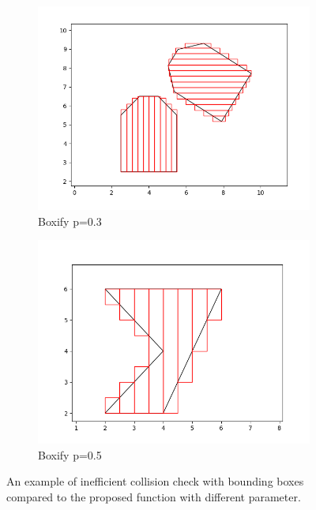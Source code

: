 \documentclass[a4paper,12pt]{article}
\DeclareRobustCommand{\[}{\begin{equation}}
\DeclareRobustCommand{\]}{\end{equation}}
\numberwithin{equation}{section}
\numberwithin{algorithm}{section}
\begin{document}
\begin{figure}[H]
\begin{subfigure}[b]{0.4\textwidth}
    \end{subfigure}
    \begin{subfigure}[b]{0.4\textwidth}
        \includegraphics[scale=0.3,width=\textwidth]{images/car_boxify_0_3.png}
        \caption{Boxify p=0.3}
    \end{subfigure}
    \begin{subfigure}[b]{0.4\textwidth}
        \includegraphics[scale=0.3,width=\textwidth]{images/concave_boxify.png}
        \caption{Boxify p=0.5}
    \end{subfigure}
    \captionsetup{width=0.6\textwidth}
    \caption{An example of inefficient collision check with bounding boxes compared to the proposed function with different parameter.}
\end{figure}
\end{document}

